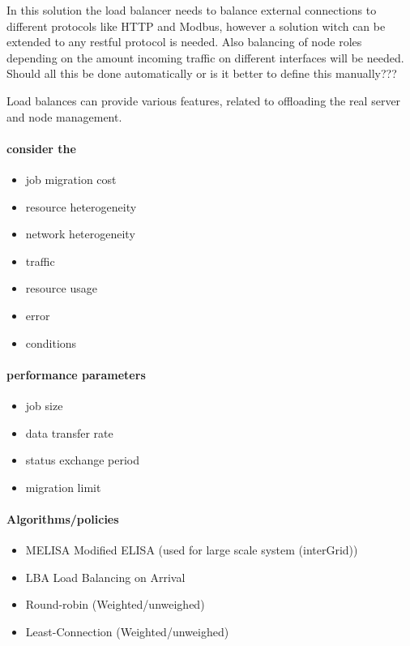 In this solution the load balancer needs to balance external connections to different protocols like HTTP and Modbus, however a solution witch can be extended to any restful protocol is needed.
Also balancing of node roles depending on the amount incoming traffic on different interfaces will be needed.
Should all this be done automatically or is it better to define this manually???

Load balances can provide various features, related to offloading the real server and node management. %

 
\paragraph{consider the} 
\begin{itemize}
\item job migration cost
\item resource heterogeneity
\item network heterogeneity

\item traffic
\item resource usage
\item error
\item conditions
\end{itemize}

\paragraph{performance parameters}
\begin{itemize}
\item job size
\item data transfer rate
\item status exchange period
\item migration limit
\end{itemize}

\paragraph{Algorithms/policies}
\begin{itemize}
	\item MELISA Modified ELISA (used for large scale system (interGrid))
	\item LBA Load Balancing on Arrival
	
	\item Round-robin (Weighted/unweighed)
	\item Least-Connection (Weighted/unweighed)
\end{itemize}

